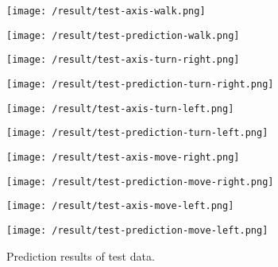 \begin{figure}
	[h]
	\texttt{[image: /result/test-axis-walk.png]} 
\end{figure}
\begin{figure}
	[h]
	\texttt{[image: /result/test-prediction-walk.png]} 
\end{figure}
\begin{figure}
	[h]
	\texttt{[image: /result/test-axis-turn-right.png]} 
\end{figure}
\begin{figure}
	[h]
	\texttt{[image: /result/test-prediction-turn-right.png]} 
\end{figure}
\begin{figure}
	[h]
	\texttt{[image: /result/test-axis-turn-left.png]} 
\end{figure}
\begin{figure}
	[h]
	\texttt{[image: /result/test-prediction-turn-left.png]} 
\end{figure}
\begin{figure}
	[h]
	\texttt{[image: /result/test-axis-move-right.png]} 
\end{figure}
\begin{figure}
	[h]
	\texttt{[image: /result/test-prediction-move-right.png]} 
\end{figure}
\begin{figure}
	[h]
	\texttt{[image: /result/test-axis-move-left.png]} 
\end{figure}
\begin{figure}
	[h]
	\texttt{[image: /result/test-prediction-move-left.png]} 
	\caption{Prediction results of test data.}
	\label{ev:test:prediction}
\end{figure}

